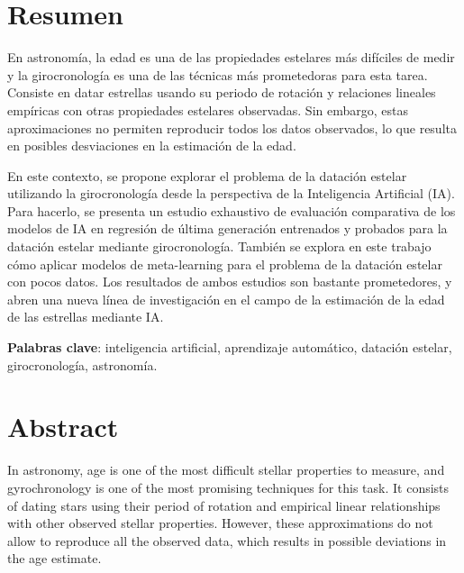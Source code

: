 \chapter{Resumen}

\vspace{0.5cm}

En astronomía, la edad es una de las propiedades estelares más difíciles de medir y la girocronología es una de las técnicas más prometedoras para esta tarea. Consiste en datar estrellas usando su periodo de rotación y relaciones lineales empíricas con otras propiedades estelares observadas. Sin embargo, estas aproximaciones no permiten reproducir todos los datos observados, lo que resulta en posibles desviaciones en la estimación de la edad.

En este contexto, se propone explorar el problema de la datación estelar utilizando la girocronología desde la perspectiva de la Inteligencia Artificial (IA). Para hacerlo, se presenta un estudio exhaustivo de evaluación comparativa de los modelos de IA en regresión de última generación entrenados y probados para la datación estelar mediante girocronología. También se explora en este trabajo cómo aplicar modelos de meta-learning para el problema de la datación estelar con pocos datos. Los resultados de ambos estudios son bastante prometedores, y abren una nueva línea de investigación en el campo de la estimación de la edad de las estrellas mediante IA.

\vspace{1cm}

\textbf{Palabras clave}: inteligencia artificial, aprendizaje automático, datación estelar, girocronología, astronomía.


\newpage
\thispagestyle{empty}
\hspace*{0.5cm}
\newpage

\chapter{Abstract}

\vspace{0.5cm}

In astronomy, age is one of the most difficult stellar properties to measure, and gyrochronology is one of the most promising techniques for this task. It consists of dating stars using their period of rotation and empirical linear relationships with other observed stellar properties. However, these approximations do not allow to reproduce all the observed data, which results in possible deviations in the age estimate.

